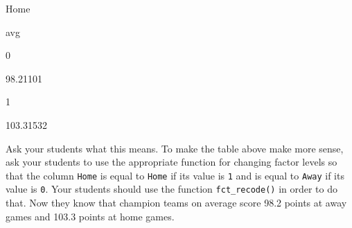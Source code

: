 \documentclass[]{book}
\newenvironment{Shaded}{\begin{snugshade}}{\end{snugshade}}
\newcommand{\CommentTok}[1]{\textcolor[rgb]{0.56,0.35,0.01}{\textit{#1}}}
\newcommand{\DataTypeTok}[1]{\textcolor[rgb]{0.13,0.29,0.53}{#1}}
\newcommand{\KeywordTok}[1]{\textcolor[rgb]{0.13,0.29,0.53}{\textbf{#1}}}
\newcommand{\NormalTok}[1]{#1}
\newcommand{\OperatorTok}[1]{\textcolor[rgb]{0.81,0.36,0.00}{\textbf{#1}}}
\newcommand{\StringTok}[1]{\textcolor[rgb]{0.31,0.60,0.02}{#1}}
\begin{document}
\begin{Shaded}
\end{Shaded}

Home

avg

0

98.21101

1

103.31532

Ask your students what this means. To make the table above make more sense, ask your students to use the appropriate function for changing factor levels so that the column \texttt{Home} is equal to \texttt{Home} if its value is \texttt{1} and is equal to \texttt{Away} if its value is \texttt{0}. Your students should use the function \texttt{fct\_recode()} in order to do that. Now they know that champion teams on average score 98.2 points at away games and 103.3 points at home games.
\end{document}

